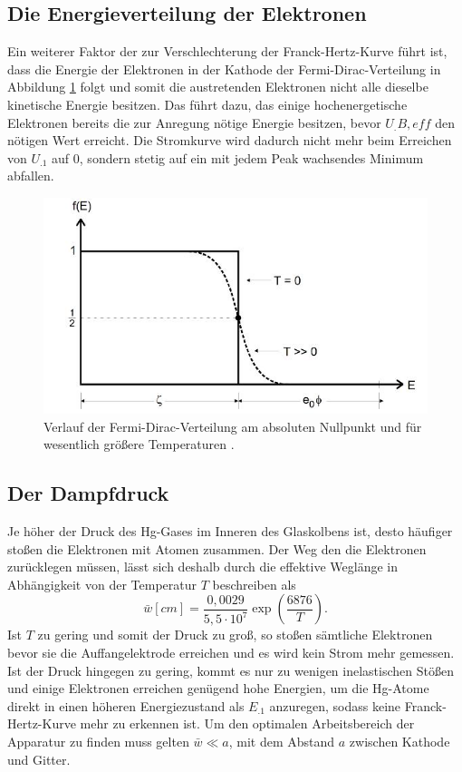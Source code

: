 \subsection{Die Energieverteilung der Elektronen}
Ein weiterer Faktor der zur Verschlechterung der Franck-Hertz-Kurve führt ist, dass die Energie der Elektronen in der Kathode der Fermi-Dirac-Verteilung in Abbildung \ref{fig:fermi} folgt und somit die austretenden Elektronen nicht alle dieselbe kinetische Energie besitzen. Das führt dazu, das einige hochenergetische Elektronen bereits die zur Anregung nötige Energie besitzen, bevor $U_.{B,eff}$ den nötigen Wert erreicht. Die Stromkurve wird dadurch nicht mehr beim Erreichen von $U_.1$ auf 0, sondern stetig auf ein mit jedem Peak wachsendes Minimum abfallen.
\begin{figure}
\centering
\includegraphics[width=\linewidth-70pt,height=\textheight-70pt,keepaspectratio]{content/images/fermi.jpg}
\caption{Verlauf der Fermi-Dirac-Verteilung am absoluten Nullpunkt und für wesentlich größere Temperaturen \cite{V504}.\label{fig:fermi}}
\end{figure}
\subsection{Der Dampfdruck}
Je höher der Druck des Hg-Gases im Inneren des Glaskolbens ist, desto häufiger stoßen die Elektronen mit Atomen zusammen. Der Weg den die Elektronen zurücklegen müssen, lässt sich deshalb durch die effektive Weglänge in Abhängigkeit von der Temperatur $T$ beschreiben als
\begin{equation}
\bar{w}[cm]=\frac{0,0029}{5,5\cdot10^7}\exp{\left(\frac{6876}{T}\right)}\text{.}\label{eq:w}
\end{equation}
Ist $T$ zu gering und somit der Druck zu groß, so stoßen sämtliche Elektronen bevor sie die Auffangelektrode erreichen und es wird kein Strom mehr gemessen. Ist der Druck hingegen zu gering, kommt es nur zu wenigen inelastischen Stößen und einige Elektronen erreichen genügend hohe Energien, um die Hg-Atome direkt in einen höheren Energiezustand als $E_.1$ anzuregen, sodass keine Franck-Hertz-Kurve mehr zu erkennen ist.
Um den optimalen Arbeitsbereich der Apparatur zu finden muss gelten $\bar{w}\ll a$, mit dem Abstand $a$ zwischen Kathode und Gitter.